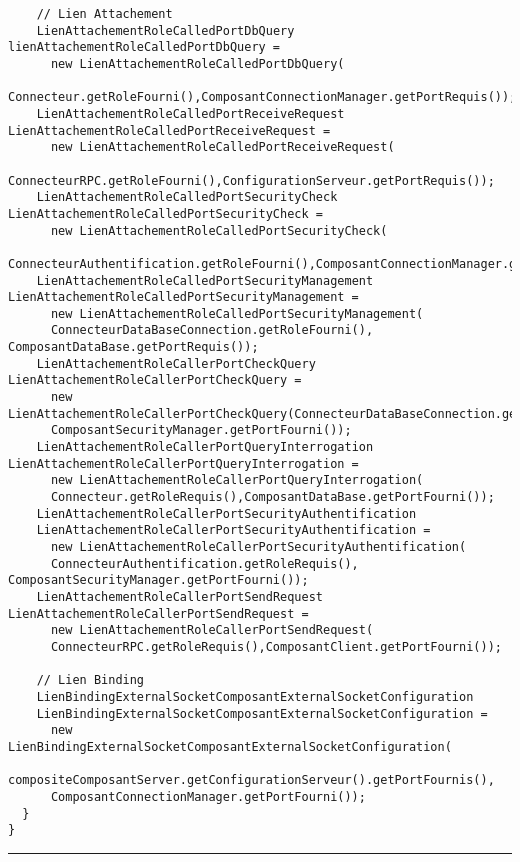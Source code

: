 \documentclass[11pt, a4paper, notitlepage]{article}
\begin{document}
\begin{lstlisting}
    // Lien Attachement
    LienAttachementRoleCalledPortDbQuery lienAttachementRoleCalledPortDbQuery =
      new LienAttachementRoleCalledPortDbQuery(
      Connecteur.getRoleFourni(),ComposantConnectionManager.getPortRequis());
    LienAttachementRoleCalledPortReceiveRequest LienAttachementRoleCalledPortReceiveRequest =
      new LienAttachementRoleCalledPortReceiveRequest(
      ConnecteurRPC.getRoleFourni(),ConfigurationServeur.getPortRequis());
    LienAttachementRoleCalledPortSecurityCheck LienAttachementRoleCalledPortSecurityCheck =
      new LienAttachementRoleCalledPortSecurityCheck(
      ConnecteurAuthentification.getRoleFourni(),ComposantConnectionManager.getPortRequis());
    LienAttachementRoleCalledPortSecurityManagement LienAttachementRoleCalledPortSecurityManagement =
      new LienAttachementRoleCalledPortSecurityManagement(
      ConnecteurDataBaseConnection.getRoleFourni(), ComposantDataBase.getPortRequis());
    LienAttachementRoleCallerPortCheckQuery LienAttachementRoleCallerPortCheckQuery =
      new LienAttachementRoleCallerPortCheckQuery(ConnecteurDataBaseConnection.getRoleRequis(),
      ComposantSecurityManager.getPortFourni());
    LienAttachementRoleCallerPortQueryInterrogation LienAttachementRoleCallerPortQueryInterrogation =
      new LienAttachementRoleCallerPortQueryInterrogation(
      Connecteur.getRoleRequis(),ComposantDataBase.getPortFourni());
    LienAttachementRoleCallerPortSecurityAuthentification
    LienAttachementRoleCallerPortSecurityAuthentification =
      new LienAttachementRoleCallerPortSecurityAuthentification(
      ConnecteurAuthentification.getRoleRequis(), ComposantSecurityManager.getPortFourni());
    LienAttachementRoleCallerPortSendRequest LienAttachementRoleCallerPortSendRequest =
      new LienAttachementRoleCallerPortSendRequest(
      ConnecteurRPC.getRoleRequis(),ComposantClient.getPortFourni());

    // Lien Binding
    LienBindingExternalSocketComposantExternalSocketConfiguration
    LienBindingExternalSocketComposantExternalSocketConfiguration =
      new LienBindingExternalSocketComposantExternalSocketConfiguration(
      compositeComposantServer.getConfigurationServeur().getPortFournis(),
      ComposantConnectionManager.getPortFourni());
  }
}
\end{lstlisting}

\vspace*{3mm}
\hrule
\vspace*{3mm}
\end{document}

